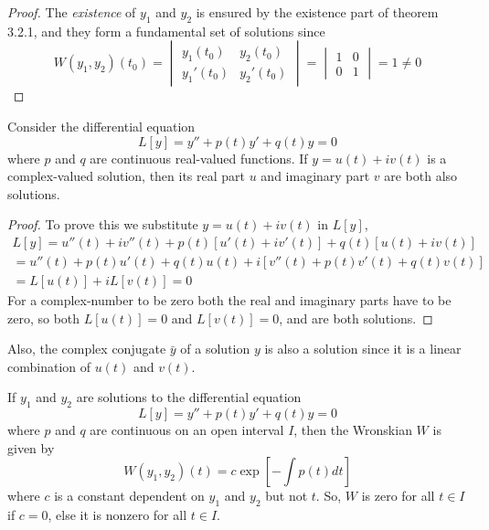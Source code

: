     \begin{proof}
        The \textit{existence} of $y_1$ and $y_2$ is ensured by the existence part of theorem 3.2.1, and they form a fundamental set of solutions since
        \begin{equation*}
            W(y_1, y_2)(t_0) = \begin{vmatrix}
                y_1(t_0) & y_2(t_0) \\
                y_1'(t_0) & y_2'(t_0)
            \end{vmatrix} = \begin{vmatrix}
                1 & 0 \\
                0 & 1
            \end{vmatrix} = 1 \neq 0
        \end{equation*}
    \end{proof}
    \begin{theorem}
        Consider the differential equation
        \begin{equation*}
            L[y] = y'' + p(t)y' + q(t)y = 0
        \end{equation*}
        where $p$ and $q$ are continuous real-valued functions. If $y = u(t) + iv(t)$ is a complex-valued solution, then its real part $u$ and imaginary part $v$ are both also solutions.
    \end{theorem}
    \begin{proof}
        To prove this we substitute $y = u(t) + iv(t)$ in $L[y]$,
        \begin{align*}
            L[y] = u''(t) + iv''(t) + p(t)[u'(t) + iv'(t)] + q(t)[u(t) + iv(t)] \\
            = u''(t) + p(t)u'(t) + q(t)u(t) + i[v''(t) + p(t)v'(t) + q(t)v(t)] \\
            = L[u(t)] + iL[v(t)] = 0
        \end{align*}
        For a complex-number to be zero both the real and imaginary parts have to be zero, so both $L[u(t)] = 0$ and $L[v(t)] = 0$, and are both solutions.
    \end{proof}
    Also, the complex conjugate $\bar{y}$ of a solution $y$ is also a solution since it is a linear combination of $u(t)$ and $v(t)$.
    \begin{theorem}
        If $y_1$ and $y_2$ are solutions to the differential equation
        \begin{equation*}
            L[y] = y'' + p(t)y' + q(t)y = 0
        \end{equation*}
        where $p$ and $q$ are continuous on an open interval $I$, then the Wronskian $W$ is given by
        \begin{equation*}
            W(y_1, y_2)(t) = c\exp[-\int p(t)dt]
        \end{equation*}
        where $c$ is a constant dependent on $y_1$ and $y_2$ but not $t$. So, $W$ is zero for all $t \in I$ if $c = 0$, else it is nonzero for all $t \in I$.         
    \end{theorem}

